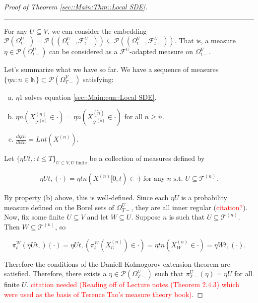 \documentclass[12pt]{article}
\newcommand{\mb}{\mathbb}
\newcommand{\mc}{\mathcal}
\newcommand{\ms}{\mathscr}
\newcommand{\te}{\text}
\newcommand{\tr}{\textcolor{red}}
\newcommand{\ind}{\hspace{24pt}}
\newcommand{\lin}{\rule{\linewidth}{0.4 pt}}
\newcommand{\pmsr}{\mc{P}}							%
\renewcommand{\U}{U}							%
\newcommand{\UU}{W}								%
\newcommand{\T}{T}								%
\renewcommand{\t}{t}							%
\newcommand{\sset}{\Omega}						%
\newcommand{\proj}{\pi}							%
\renewcommand{\tt}{s}							%
\newcommand{\F}{\mc{F}}							%
\newcommand{\X}{X}								%
\newcommand{\vsi}[1]{^{#1}}						%
\newcommand{\cind}[1]{_{#1}}					%
\newcommand{\tip}[1]{#1}						%
\newcommand{\ts}[1]{_{#1}}						%
\newcommand{\tree}{\mc{T}}						%
\newcommand{\sln}[1]{^{(#1)}}						%
\newcommand{\alt}[1]{\widetilde{#1}}			%
\newcommand{\mm}{\nu}							%
\newcommand{\mmm}{\eta}							%
\newcommand{\dense}{L}							%
\begin{document}
\begin{proof}[Proof of Theorem \ref{sec::Main:Thm::Local SDE}]
\lin

For any \(\U\subseteq V\), we can consider the embedding \(\pmsr\left(\sset\vsi{\U}\ts{\t-}\right) = \pmsr\left((\sset\vsi{\U}\ts{\t-},\F\vsi{\U}\ts{\t-})\right) \subseteq \pmsr\left((\sset\vsi{V}\ts{\t-},\F\vsi{\U}\ts{\t-})\right)\). That is, a measure \(\mmm{}{}{}\in \pmsr\left(\sset\vsi{\U}\ts{\t-}\right)\) can be considered as a \(\F\vsi{\U}\ts{}\)-adapted measure on \(\sset\vsi{V}\ts{\t-}\).

\ind Let's summarize what we have so far. We have a sequence of measures \(\{\mmm{}{}{n}:n\in\mb{N}\} \subset \pmsr(\sset\vsi{V}\ts{\T-})\) satisfying:

\begin{enumerate}[(a)]
\item \(\mmm{}{}{1}\) solves equation \eqref{sec::Main:eqn::Local SDE}.

\item \(\mmm{}{}{n}(\X\sln{n}\cind{\tree\sln{\alt{n}}}\tip{} \in \cdot) = \mmm{}{}{\alt{n}}(\X\sln{\alt{n}}\cind{\tree\sln{\alt{n}}}\tip{}\in \cdot)\) for all \(n \geq \alt{n}\).

\item \(\frac{d\mmm{}{\t}{n}}{d\mm{}{\t}{n}} = \dense{n}{\t}(\X\sln{n}\cind{}\tip{})\).
\end{enumerate}

Let \(\{\mmm{\U}{\t,}{}:\t \leq \T\}_{\U\subset V,\U\te{ finite}}\) be a collection of measures defined by

\[\mmm{\U}{\t,}{}(\cdot) = \mmm{}{\t}{n}(\X\sln{n}\cind{}\tip{[0,\t)} \in \cdot) \te{ for any }n\te{ \tt.\t. }\U \subseteq \tree\sln{n}.\]

By property (b) above, this is well-defined. Since each \(\mmm{\U}{}{}\) is a probability measure defined on the Borel sets of \(\sset\vsi{\U}\ts{\T-}\), they are all inner regular (\tr{citation?}). Now, fix some finite \(\U\subseteq V\) and let \(\UU \subseteq \U\). Suppose \(n\) is such that \(\U \subseteq \tree\sln{n}\). Then \(\UU\subseteq \tree\sln{n}\), so

\[\proj\vsi{\UU}\ts{\t}(\mmm{\U}{\t,}{})(\cdot) = \mmm{\U}{\t,}{}\left(\proj\vsi{\UU}\ts{\t}(\X\sln{n}\cind{\U}\tip{}) \in \cdot\right) = \mmm{}{\t}{n}\left(\X\sln{n}\cind{\UU}\tip{} \in \cdot\right) = \mmm{\UU}{\t,}{}(\cdot).\]

Therefore the conditions of the Daniell-Kolmogorov extension theorem are satisfied. Therefore, there exists a \(\mmm{}{}{}\in \ms{P}(\sset\vsi{\U}\ts{\T-})\) such that \(\proj\vsi{\U}\ts{\T-}(\mmm{}{}{}) =\mmm{\U}{}{}\) for all finite \(\U\). \tr{citation needed (Reading off of Lecture notes (Theorem 2.4.3) which were used as the basis of Terence Tao's measure theory book)}.


\end{proof}
\end{document}
